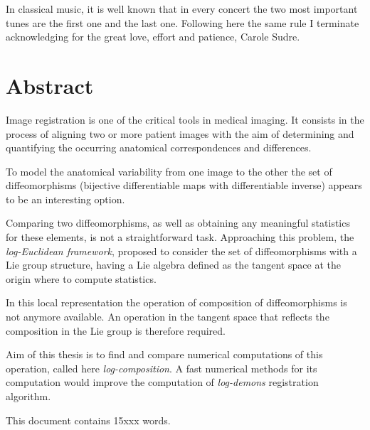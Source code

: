 In classical music, it is well known that in every concert the two most important tunes are the first one and the last one. Following here the same rule I terminate acknowledging for the great love, effort and patience, Carole Sudre.


\qquad
\pagestyle{empty}
\newpage


\section*{Abstract}

Image registration is one of the critical tools in medical imaging. It consists in the process of aligning two or more patient images with the aim of determining and quantifying the occurring anatomical correspondences and differences. 

To model the anatomical variability from one image to the other the set of diffeomorphisms (bijective differentiable maps with differentiable inverse) appears to be an interesting option.

Comparing two diffeomorphisms, as well as obtaining any meaningful statistics for these elements, is not a straightforward task.
Approaching this problem, the \emph{log-Euclidean framework}, proposed to consider the set of diffeomorphisms with a Lie group structure, having a Lie algebra defined as the tangent space at the origin where to compute statistics.

In this local representation the operation of composition of diffeomorphisms is not anymore available. An operation in the tangent space that reflects the composition in the Lie group is therefore required.

Aim of this thesis is to find and compare numerical computations of this operation, called here \emph{log-composition}. 
A fast numerical methods for its computation would improve the computation of \emph{log-demons} registration algorithm.


\begin{flushright}
This document contains 15xxx words. 
\end{flushright}

